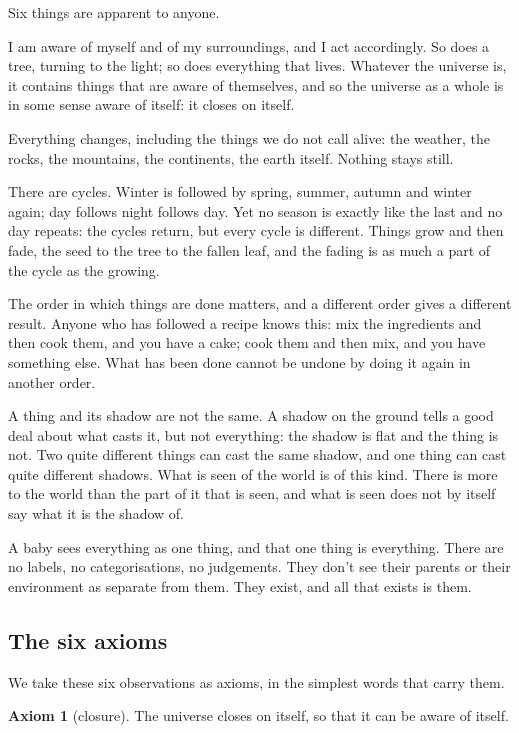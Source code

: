 \documentclass[11pt,a4paper]{article}
\theoremstyle{plain}
\theoremstyle{definition}
\newtheorem{axiom}{Axiom}
\theoremstyle{remark}
\begin{document}
Six things are apparent to anyone.

I am aware of myself and of my surroundings, and I act accordingly. So does a tree, turning to the light; so does everything that lives. Whatever the universe is, it contains things that are aware of themselves, and so the universe as a whole is in some sense aware of itself: it closes on itself.

Everything changes, including the things we do not call alive: the weather, the rocks, the mountains, the continents, the earth itself. Nothing stays still.

There are cycles. Winter is followed by spring, summer, autumn and winter again; day follows night follows day. Yet no season is exactly like the last and no day repeats: the cycles return, but every cycle is different. Things grow and then fade, the seed to the tree to the fallen leaf, and the fading is as much a part of the cycle as the growing.

The order in which things are done matters, and a different order gives a different result. Anyone who has followed a recipe knows this: mix the ingredients and then cook them, and you have a cake; cook them and then mix, and you have something else. What has been done cannot be undone by doing it again in another order.

A thing and its shadow are not the same. A shadow on the ground tells a good deal about what casts it, but not everything: the shadow is flat and the thing is not. Two quite different things can cast the same shadow, and one thing can cast quite different shadows. What is seen of the world is of this kind. There is more to the world than the part of it that is seen, and what is seen does not by itself say what it is the shadow of.

A baby sees everything as one thing, and that one thing is everything. There are no labels, no categorisations, no judgements. They don't see their parents or their environment as separate from them. They exist, and all that exists is them.

\subsection{The six axioms}\label{sec:fouraxioms}

We take these six observations as axioms, in the simplest words that carry them.

\begin{axiom}[closure]\label{ax:A1}
The universe closes on itself, so that it can be aware of itself.
\end{axiom}
\end{document}
